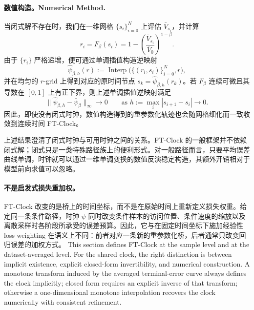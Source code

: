 \paragraph{\ifinternalcn 数值构造。\else Numerical Method.\fi}
当闭式解不存在时，我们在一维网格 $\{s_i\}_{i=0}^N$ 上评估 $\bar{V}_{s_i}$，并计算
\begin{equation}
  r_i
  =
  F_{\beta}(s_i)
  =
  1-\left(\frac{\bar{V}_{s_i}}{\bar{V}_0}\right)^{1-\beta}.
\end{equation}
由于 $\{r_i\}$ 严格递增，便可通过单调插值构造逆映射
\begin{equation}
  \hat{\psi}_{\beta,h}(r)
  :=
  \operatorname{Interp}\bigl(\{(r_i,s_i)\}_{i=0}^N,r\bigr),
\end{equation}
并在均匀的 $r$-grid 上得到对应的原时间节点 $s_k=\hat{\psi}_{\beta,h}(r_k)$。若 $F_{\beta}$ 连续可微且其导数在 $[0,1]$ 上有正下界，则上述单调插值逆映射满足
\begin{equation}
  \|\hat{\psi}_{\beta,h}-\bar{\psi}_{\beta}\|_{\infty} \to 0
  \qquad \text{as } h:=\max_i |s_{i+1}-s_i| \to 0.
\end{equation}
因此，即使没有闭式时钟，数值构造得到的重参数化轨迹也会随网格细化而一致收敛到连续时间 FT-Clock。

\begin{remark}
上述结果澄清了闭式时钟与可用时钟之间的关系。FT-Clock 的一般框架并不依赖闭式解；闭式只是一类特殊路径族上的便利形式。对一般路径而言，只要平均误差曲线单调，时钟就可以通过一维单调变换的数值反演稳定构造，其额外开销相对于模型前向求值可以忽略。
\end{remark}

\paragraph{不是启发式损失重加权。}
FT-Clock 改变的是桥上的时间坐标，而不是在原始时间上重新定义损失权重。给定同一条条件路径，时钟 $\psi$ 同时改变条件样本的访问位置、条件速度的缩放以及离散采样时各阶段所承受的误差预算。因此，它与在固定时间坐标下施加经验性 loss weighting 在语义上不同：前者对应一条新的重参数化桥，后者通常只改变回归误差的加权方式。
\else
This section defines FT-Clock at the sample level and at the dataset-averaged level. For the shared clock, the right distinction is between implicit existence, explicit closed-form invertibility, and numerical construction. A monotone transform induced by the averaged terminal-error curve always defines the clock implicitly; closed form requires an explicit inverse of that transform; otherwise a one-dimensional monotone interpolation recovers the clock numerically with consistent refinement.
\fi
